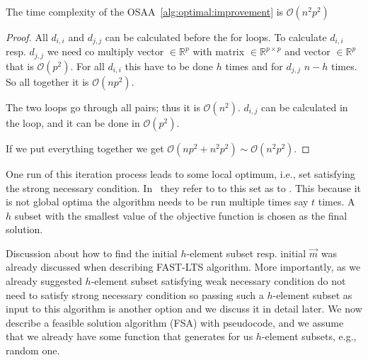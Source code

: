 \begin{observation} 
     The time complexity of the OSAA~\ref{alg:optimal:improvement} is $\mathcal{O}(n^2p^2)$
\end{observation} 


\begin{proof}
All $d_{i,i}$ and $d_{j,j}$ can be calculated before the for loops. 
To calculate $d_{i,i}$ resp. $d_{j,j}$ we need co multiply vector $\in \mathbb{R}^p$ with matrix  $\in \mathbb{R}^{p \times p}$ and vector $\in \mathbb{R}^p$ that is $\mathcal{O}(p^2)$. For all $d_{i,i}$ this have to be done $h$ times and for $d_{j,j}$ $n-h$ times. So all together it is $\mathcal{O}(np^2)$. 

The two loops go through all pairs; thus it is $\mathcal{O}(n^2)$. $d_{i,j}$ can be calculated in the loop, and it can be done in $\mathcal{O}(p^2)$.

If we put everything together we get 
$\mathcal{O}(np^2 + n^2p^2) \sim \mathcal{O}(n^2p^2)$.
\end{proof}


One run of this iteration process leads to some local optimum, i.e., set satisfying the strong necessary condition. In~\cite{hawkins:1994} they refer to to this set as to .
This because it is not global optima the algorithm needs to be run multiple times say $t$ times. A $h$  subset with the smallest value of the objective function is chosen as the final solution.

Discussion about how to find the initial $h$-element subset resp. initial $\vec{m}$ was already discussed when describing FAST-LTS algorithm.
More importantly, as we already suggested $h$-element subset satisfying weak necessary condition do not need to satisfy strong necessary condition so passing such a $h$-element subset as input to this algorithm is another option and we discuss it in detail later. We now describe a feasible solution algorithm (FSA) with pseudocode, and we assume that we already have some function that generates for us $h$-element subsets, e.g., random one. 

\newcommand\mycommfont[1]{\footnotesize\ttfamily\textcolor{blue}{#1}}

